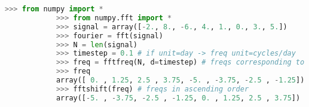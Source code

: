 		\begin{lstlisting}[language=python]
			>>> from numpy import *
			>>> from numpy.fft import *
			>>> signal = array([-2., 8., -6., 4., 1., 0., 3., 5.])
			>>> fourier = fft(signal)
			>>> N = len(signal)
			>>> timestep = 0.1 # if unit=day -> freq unit=cycles/day
			>>> freq = fftfreq(N, d=timestep) # freqs corresponding to 'fourier'
			>>> freq
			array([ 0. , 1.25, 2.5 , 3.75, -5. , -3.75, -2.5 , -1.25])
			>>> fftshift(freq) # freqs in ascending order
			array([-5. , -3.75, -2.5 , -1.25, 0. , 1.25, 2.5 , 3.75])
		\end{lstlisting}

